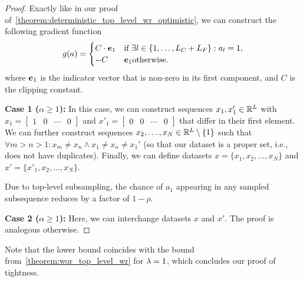 \begin{proof}
    Exactly like in our proof of~\cref{theorem:deterministic_top_level_wr_optimistic}, we can construct the following gradient function 
    \begin{equation*}
        g(a) = \begin{cases}
            C \cdot {\bm{e}}_1 & \text{if } \exists l \in \{1,\dots,L_C + L_F\} : a_l = 1, \\
            -C & {\bm{e}}_1 \text{otherwise.}
        \end{cases}
    \end{equation*}
    where ${\bm{e}}_1$ is the indicator vector that is non-zero in its first component, 
    and $C$ is the clipping constant.
     
    \textbf{Case 1 ($\alpha \geq 1$):}
    In this case, we can construct sequences $x_1, x'_1 \in {\mathbb{R}}^{L}$ with
    $x_1 = \begin{bmatrix}
        1 & 0 & \cdots & 0
    \end{bmatrix}$
    and 
    $x'_1 = \begin{bmatrix}
        0 & 0 & \cdots & 0
    \end{bmatrix}$
    that differ in their first element.
    We can further construct
     sequences $x_2,\dots,x_N \in {\mathbb{R}}^L \setminus \{1\}$ such that $\forall m > n > 1 : x_m \neq x_n \land x_1 \neq x_n \neq x_1'$ (so that our dataset is a proper set, i.e., does not have duplicates).
    Finally, we can define datasets $x = \{x_1,x_2,\dots,x_N\}$ and $x' = \{x'_1,x_2,\dots,x_N\}$.

    Due to top-level subsampling, the chance of $a_1$ appearing in any sampled subsequence reduces by a factor of $ 1 - \rho$.

    \textbf{Case 2 ($\alpha \geq 1$):}
    Here, we can interchange datasets $x$ and $x'$. The proof is analogous otherwise.
\end{proof}
Note that the lower bound coincides with the bound from~\cref{theorem:wor_top_level_wr} for $\lambda=1$, which concludes our proof of tightness.

